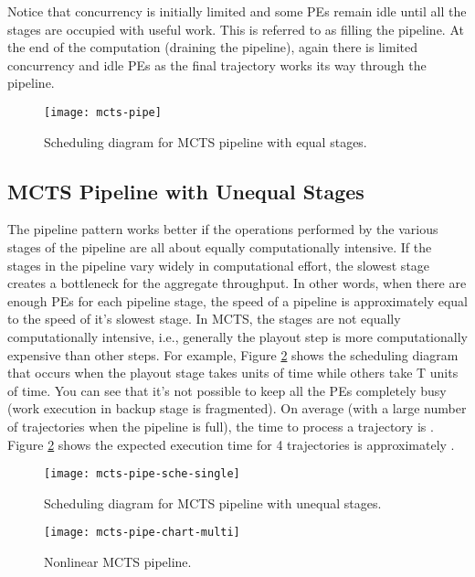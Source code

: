 \documentclass[10pt, conference, compsocconf]{IEEEtran}
\begin{document}
Notice that concurrency is initially limited and some PEs remain idle until all the stages are occupied with useful work. This is referred to as filling the pipeline. At the end of the computation (draining the pipeline), again there is limited concurrency and idle PEs as the final trajectory works its way through the pipeline. 





\begin{figure}
\centering
\texttt{[image: mcts-pipe]}
\caption{Scheduling diagram for MCTS pipeline with equal stages.}
\label{fig:mcts-pipe-1}
\end{figure}




\subsection{MCTS Pipeline with Unequal Stages}


The pipeline pattern works better if the operations performed by the various stages of the pipeline are all about equally computationally intensive. If the stages in the pipeline vary widely in computational effort, the slowest stage creates a bottleneck for the aggregate throughput. In other words, when there are enough PEs for each pipeline stage, the speed of a pipeline is approximately equal to the speed of it's slowest stage. In MCTS, the stages are not equally computationally intensive, i.e., generally the playout step is more computationally expensive than other steps.
For example, Figure \ref{fig:mcts-pipe-sche-single} shows the scheduling diagram that occurs when the playout stage takes  units of time while others take T units of time.  
You can see that it's not possible to keep all the PEs completely busy (work execution in backup stage is fragmented). On average (with a large number of trajectories when the pipeline is full), the time to process a trajectory is . Figure \ref{fig:mcts-pipe-sche-single} shows the expected execution time for 4 trajectories is approximately . 

\begin{figure}
\centering
\texttt{[image: mcts-pipe-sche-single]}
\caption{Scheduling diagram for MCTS pipeline with unequal stages.}
\label{fig:mcts-pipe-sche-single}
\end{figure}



\begin{figure}
\centering
\texttt{[image: mcts-pipe-chart-multi]}
\caption{Nonlinear MCTS pipeline.}
\label{fig:mcts-pipe-chart-multi}
\end{figure}
\end{document}
